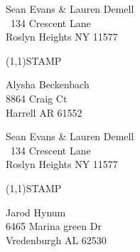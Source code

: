 \documentclass[12pt]{article}
\begin{document}
\clearpage

\begin{minipage}{.5\linewidth} \noindent
Sean Evans \& Lauren Demell\\\ 
134 Crescent Lane\\ 
Roslyn Heights NY 11577
\end{minipage}
\begin{minipage}{.5\linewidth \hspace{-.2in} \vspace{-.3in}}
\begin{flushright}
\framebox(1,1){STAMP}
\end{flushright}
\end{minipage}

\begin{center} \begin{Huge} \vspace*{\fill}
Alysha Beckenbach\\
8864 Craig Ct\\
Harrell AR 61552\\
\vspace{\fill} \end{Huge} \end{center}

\clearpage

\begin{minipage}{.5\linewidth} \noindent
Sean Evans \& Lauren Demell\\\ 
134 Crescent Lane\\ 
Roslyn Heights NY 11577
\end{minipage}
\begin{minipage}{.5\linewidth \hspace{-.2in} \vspace{-.3in}}
\begin{flushright}
\framebox(1,1){STAMP}
\end{flushright}
\end{minipage}

\begin{center} \begin{Huge} \vspace*{\fill}
Jarod Hynum\\
6465 Marina green Dr\\
Vredenburgh AL 62530\\
\vspace{\fill} \end{Huge} \end{center}
\end{document}
